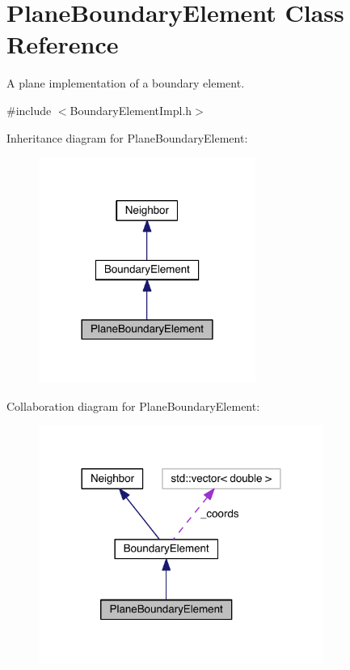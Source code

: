 \hypertarget{classPlaneBoundaryElement}{\section{Plane\+Boundary\+Element Class Reference}
\label{classPlaneBoundaryElement}
}


A plane implementation of a boundary element.  




{\ttfamily \#include $<$Boundary\+Element\+Impl.\+h$>$}



Inheritance diagram for Plane\+Boundary\+Element\+:\nopagebreak
\begin{figure}[H]
\begin{center}
\leavevmode
\includegraphics[width=201pt]{classPlaneBoundaryElement__inherit__graph}
\end{center}
\end{figure}


Collaboration diagram for Plane\+Boundary\+Element\+:\nopagebreak
\begin{figure}[H]
\begin{center}
\leavevmode
\includegraphics[width=264pt]{classPlaneBoundaryElement__coll__graph}
\end{center}
\end{figure}

